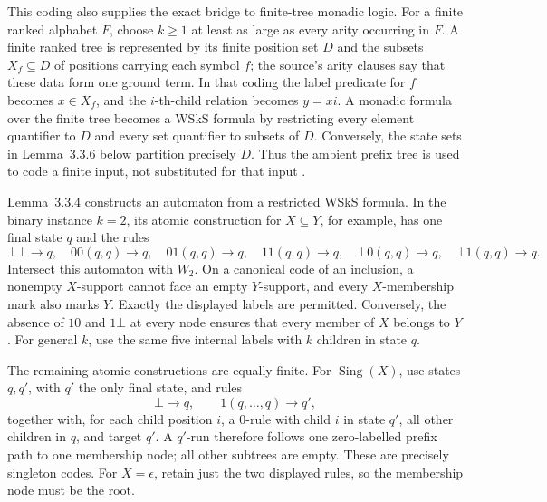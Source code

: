 This coding also supplies the exact bridge to finite-tree monadic logic.  For
a finite ranked alphabet \(F\), choose \(k\geq1\) at least as large as every
arity occurring in \(F\).  A finite ranked tree is represented by its finite
position set \(D\) and the
subsets \(X_f\subseteq D\) of positions carrying each symbol \(f\); the
source's arity clauses say that these data form one ground term.  In that
coding the label predicate for \(f\) becomes \(x\in X_f\), and the
\(i\)-th-child relation becomes \(y=xi\).  A monadic formula over the finite
tree becomes a WSkS formula by restricting every element quantifier to \(D\)
and every set quantifier to subsets of \(D\).
Conversely, the state sets in Lemma~3.3.6 below partition precisely \(D\).
Thus the ambient prefix tree is used to code a finite input, not substituted
for that input \cite[pp.~89--95]{ComonEtAl2007}.

Lemma~3.3.4 constructs an automaton from a restricted WSkS formula.  In the
binary instance \(k=2\), its atomic construction for \(X\subseteq Y\), for
example, has one final state \(q\) and the rules
\[
 \bot\bot\to q,\quad 00(q,q)\to q,\quad 01(q,q)\to q,\quad
 11(q,q)\to q,\quad \bot0(q,q)\to q,\quad \bot1(q,q)\to q.
\]
Intersect this automaton with \(W_2\).
On a canonical code of an inclusion, a nonempty \(X\)-support
cannot face an empty \(Y\)-support, and every \(X\)-membership mark
also marks \(Y\).  Exactly the displayed labels are permitted.
Conversely, the absence of \(10\) and \(1\bot\) at every node
ensures that every member of \(X\) belongs to \(Y\).
For general \(k\), use the same five internal labels with \(k\)
children in state \(q\).

The remaining atomic constructions are equally finite.
For \(\operatorname{Sing}(X)\), use states \(q,q'\), with \(q'\)
the only final state, and rules
\[
 \bot\to q,\qquad 1(q,\ldots,q)\to q',
\]
together with, for each child position \(i\), a \(0\)-rule with
child \(i\) in state \(q'\), all other children in \(q\), and target \(q'\).
A \(q'\)-run therefore follows one zero-labelled prefix path to
one membership node; all other subtrees are empty.
These are precisely singleton codes.
For \(X=\epsilon\), retain just the two displayed rules, so the
membership node must be the root.

